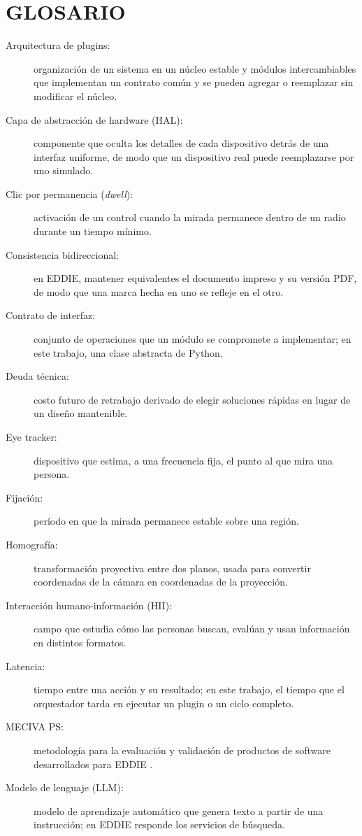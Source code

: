 \chapter*{GLOSARIO}

\begin{description}
  \item[Arquitectura de plugins:] organización de un sistema en un núcleo estable y módulos intercambiables que implementan un contrato común y se pueden agregar o reemplazar sin modificar el núcleo.
  \item[Capa de abstracción de hardware (HAL):] componente que oculta los detalles de cada dispositivo detrás de una interfaz uniforme, de modo que un dispositivo real puede reemplazarse por uno simulado.
  \item[Clic por permanencia (\textit{dwell}):] activación de un control cuando la mirada permanece dentro de un radio durante un tiempo mínimo.
  \item[Consistencia bidireccional:] en EDDIE, mantener equivalentes el documento impreso y su versión PDF, de modo que una marca hecha en uno se refleje en el otro.
  \item[Contrato de interfaz:] conjunto de operaciones que un módulo se compromete a implementar; en este trabajo, una clase abstracta de Python.
  \item[Deuda técnica:] costo futuro de retrabajo derivado de elegir soluciones rápidas en lugar de un diseño mantenible.
  \item[Eye tracker:] dispositivo que estima, a una frecuencia fija, el punto al que mira una persona.
  \item[Fijación:] período en que la mirada permanece estable sobre una región.
  \item[Homografía:] transformación proyectiva entre dos planos, usada para convertir coordenadas de la cámara en coordenadas de la proyección.
  \item[Interacción humano-información (HII):] campo que estudia cómo las personas buscan, evalúan y usan información en distintos formatos.
  \item[Latencia:] tiempo entre una acción y su resultado; en este trabajo, el tiempo que el orquestador tarda en ejecutar un plugin o un ciclo completo.
  \item[MECIVA PS:] metodología para la evaluación y validación de productos de software desarrollados para EDDIE \citep{ibaceta2023}.
  \item[Modelo de lenguaje (LLM):] modelo de aprendizaje automático que genera texto a partir de una instrucción; en EDDIE responde los servicios de búsqueda.

\end{description}
